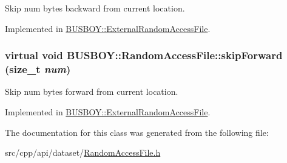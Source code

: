 Skip num bytes backward from current location. 

Implemented in \hyperlink{classBUSBOY_1_1ExternalRandomAccessFile_a276a851c64fd6de2ecc00d06ed1f2fed}{BUSBOY::ExternalRandomAccessFile}.\hypertarget{classBUSBOY_1_1RandomAccessFile_a45010d12ee4e8c98f5e71273bdf32cf3}{
\subsubsection[{skipForward}]{\setlength{\rightskip}{0pt plus 5cm}virtual void BUSBOY::RandomAccessFile::skipForward (size\_\-t {\em num})}}
\label{classBUSBOY_1_1RandomAccessFile_a45010d12ee4e8c98f5e71273bdf32cf3}


Skip num bytes forward from current location. 

Implemented in \hyperlink{classBUSBOY_1_1ExternalRandomAccessFile_a58a36479f064e4748302f256bde83519}{BUSBOY::ExternalRandomAccessFile}.

The documentation for this class was generated from the following file:\begin{DoxyCompactItemize}
\item 
src/cpp/api/dataset/\hyperlink{RandomAccessFile_8h}{RandomAccessFile.h}\end{DoxyCompactItemize}
